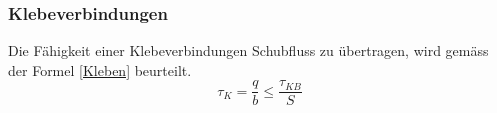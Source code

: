 
  \subsubsection{Klebeverbindungen}
  Die Fähigkeit einer Klebeverbindungen Schubfluss zu übertragen, wird gemäss der Formel \ref{Kleben} beurteilt.
  \begin{equation}
    \label{Kleben}
    \tau_K = \frac{q}{b} \leq \frac{\tau_{KB}}{S}
  \end{equation}


\newpage
